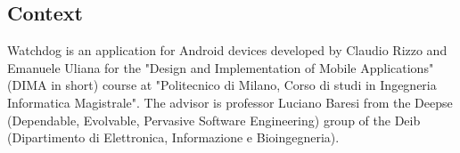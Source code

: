 \subsection{Context} 
\small{Watchdog is an application for Android devices developed by Claudio Rizzo and Emanuele Uliana for the "Design and Implementation of Mobile Applications" (DIMA in short) course at "Politecnico di Milano, Corso di studi in Ingegneria Informatica Magistrale". The advisor is professor Luciano Baresi from the Deepse (Dependable, Evolvable, Pervasive Software Engineering) group of the Deib (Dipartimento di Elettronica, Informazione e Bioingegneria).}